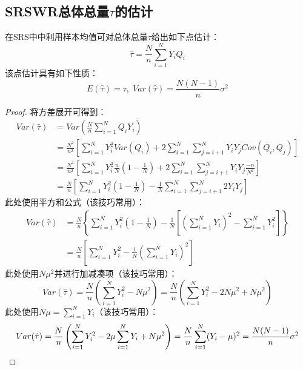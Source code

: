 \subsection{SRSWR总体总量$\tau$的估计}
\begin{theorem}
	在SRS中中利用样本均值可对总体总量$\tau$给出如下点估计：
	\begin{equation*}
		\hat{\tau}=\frac{N}{n}\sum_{i=1}^NY_iQ_i
	\end{equation*}
	该点估计具有如下性质：
	\begin{equation*}
		E(\hat{\tau})=\tau,\;Var(\hat{\tau})=\frac{N(N-1)}{n}\sigma^2
	\end{equation*}
\end{theorem}
\begin{proof}
	将方差展开可得到：
	\begin{align*}
		Var(\hat{\tau})
		&=Var\left(\frac{N}{n}\sum_{i=1}^N Q_iY_i\right) \\
		&=\frac{N^2}{n^2}\left[\sum_{i=1}^{N}Y_i^2 Var(Q_i)+2\sum_{i=1}^N\sum_{j=i+1}^NY_iY_j Cov(Q_i, Q_j)\right] \\
		&=\frac{N^2}{n^2}\left[\sum_{i=1}^{N}Y_i^2\frac{n}{N}\left(1-\frac{1}{N}\right)+2\sum_{i=1}^N\sum_{j=i+1}^NY_iY_j \frac{-n}{N^2}\right] \\
		&=\frac{N}{n}\left[\sum_{i=1}^{N}Y_i^2\left(1-\frac{1}{N}\right)-\frac{1}{N}\sum_{i=1}^N\sum_{j=i+1}^N2Y_iY_j\right]
	\end{align*}
	此处使用平方和公式（该技巧常用）：
	\begin{align*}
		Var(\hat{\tau})
		&=\frac{N}{n}\left\{\sum_{i=1}^{N}Y_i^2\left(1-\frac{1}{N}\right)-\frac{1}{N}\left[\left(\sum_{i=1}^NY_i\right)^2-\sum_{i=1}^NY_i^2\right]\right\} \\
		&=\frac{N}{n}\left[\sum_{i=1}^{N}Y_i^2-\frac{1}{N}\left(\sum_{i=1}^NY_i\right)^2\right]
	\end{align*}
	此处使用$N\mu^2$并进行加减凑项（该技巧常用）：
	\begin{equation*}
		Var(\hat{\tau})          =\frac{N}{n}\left(\sum_{i=1}^{N}Y_i^2-N\mu^2\right)
		=\frac{N}{n}\left(\sum_{i=1}^{N}Y_i^2-2N\mu^2+N\mu^2\right)
	\end{equation*}
	此处使用$N\mu=\sum\limits_{i=1}^NY_i$（该技巧常用）：
	\begin{equation*}
		Var(\hat{\tau}) =\frac{N}{n}\left(\sum_{i=1}^{N}Y_i^2-2\mu\sum_{i=1}^NY_i+N\mu^2\right)
		=\frac{N}{n}\sum_{i=1}^N(Y_i-\mu)^2
		=\frac{N(N-1)}{n}\sigma^2 \qedhere
	\end{equation*}
\end{proof}
